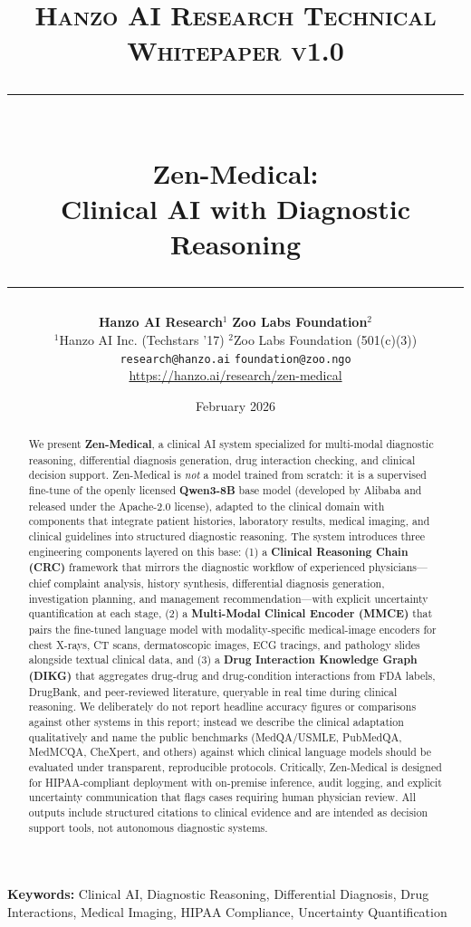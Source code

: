 \documentclass[11pt,a4paper]{article}
\title{
    \vspace{-1.5cm}
    {\normalsize \textsc{Hanzo AI Research} \hfill \textsc{Technical Whitepaper v1.0}} \\[0.8em]
    \rule{\linewidth}{0.5pt} \\[0.6em]
    {\LARGE \textbf{Zen-Medical:}} \\[0.3em]
    {\Large Clinical AI with Diagnostic Reasoning} \\[0.3em]
    \rule{\linewidth}{0.5pt}
}
\author{    \textbf{Hanzo AI Research}$^{1}$ \quad \textbf{Zoo Labs Foundation}$^{2}$ \\[0.6em]
    $^{1}$Hanzo AI Inc. (Techstars '17) \quad $^{2}$Zoo Labs Foundation (501(c)(3)) \\[0.3em]
    \texttt{research@hanzo.ai} \quad \texttt{foundation@zoo.ngo} \\[0.3em]
    {\small \url{https://hanzo.ai/research/zen-medical}}
}
\date{February 2026}
\begin{document}
\maketitle

\begin{abstract}
We present \textbf{Zen-Medical}, a clinical AI system specialized for multi-modal diagnostic reasoning, differential diagnosis generation, drug interaction checking, and clinical decision support. Zen-Medical is \emph{not} a model trained from scratch: it is a supervised fine-tune of the openly licensed \textbf{Qwen3-8B} base model (developed by Alibaba and released under the Apache-2.0 license), adapted to the clinical domain with components that integrate patient histories, laboratory results, medical imaging, and clinical guidelines into structured diagnostic reasoning. The system introduces three engineering components layered on this base: (1) a \textbf{Clinical Reasoning Chain (CRC)} framework that mirrors the diagnostic workflow of experienced physicians---chief complaint analysis, history synthesis, differential diagnosis generation, investigation planning, and management recommendation---with explicit uncertainty quantification at each stage, (2) a \textbf{Multi-Modal Clinical Encoder (MMCE)} that pairs the fine-tuned language model with modality-specific medical-image encoders for chest X-rays, CT scans, dermatoscopic images, ECG tracings, and pathology slides alongside textual clinical data, and (3) a \textbf{Drug Interaction Knowledge Graph (DIKG)} that aggregates drug-drug and drug-condition interactions from FDA labels, DrugBank, and peer-reviewed literature, queryable in real time during clinical reasoning. We deliberately do not report headline accuracy figures or comparisons against other systems in this report; instead we describe the clinical adaptation qualitatively and name the public benchmarks (MedQA/USMLE, PubMedQA, MedMCQA, CheXpert, and others) against which clinical language models should be evaluated under transparent, reproducible protocols. Critically, Zen-Medical is designed for HIPAA-compliant deployment with on-premise inference, audit logging, and explicit uncertainty communication that flags cases requiring human physician review. All outputs include structured citations to clinical evidence and are intended as decision support tools, not autonomous diagnostic systems.
\end{abstract}

\vspace{0.5em}
\noindent\textbf{Keywords:} Clinical AI, Diagnostic Reasoning, Differential Diagnosis, Drug Interactions, Medical Imaging, HIPAA Compliance, Uncertainty Quantification
\end{document}

